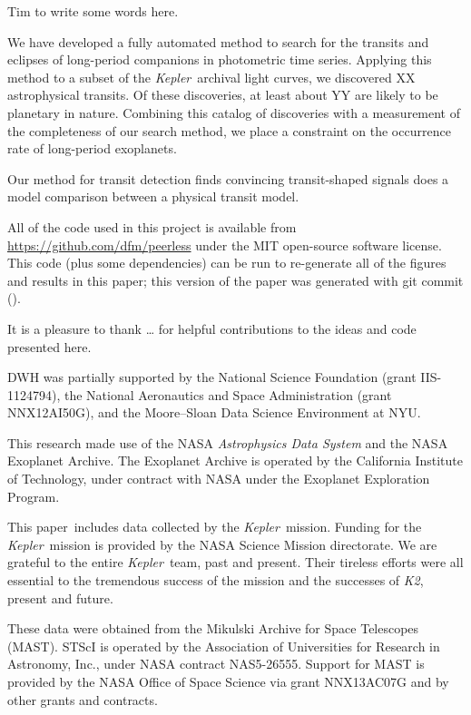 \documentclass[manuscript, letterpaper]{aastex6}
\makeatletter
\let\origsection\section
\renewcommand\section{\@ifstar{\starsection}{\nostarsection}}
\newcommand\nostarsection[1]{\sectionprelude\origsection{#1}}
\newcommand\starsection[1]{\sectionprelude\origsection*{#1}}
\newcommand\sectionprelude{\vspace{1em}}
\newcommand{\project}[1]{\textsl{#1}}
\newcommand{\kepler}{\project{Kepler}}
\newcommand{\KT}{\project{K2}}
\newcommand{\sectlabel}[1]{\label{sect:#1}}
\newcommand{\paper}{paper}
\makeatother
\begin{document}
Tim to write some words here.



\section{Discussion}\sectlabel{discussion}

We have developed a fully automated method to search for the transits and
eclipses of long-period companions in photometric time series.
Applying this method to a subset of the \kepler\ archival light curves, we
discovered XX astrophysical transits.
Of these discoveries, at least about YY are likely to be planetary in nature.
Combining this catalog of discoveries with a measurement of the completeness
of our search method, we place a constraint on the occurrence rate of
long-period exoplanets.

Our method for transit detection finds convincing transit-shaped signals does
a model comparison between a physical transit model.

All of the code used in this project is available from
\url{https://github.com/dfm/peerless} under the MIT open-source software
license.
This code (plus some dependencies) can be run to re-generate all of the
figures and results in this \paper; this version of the paper was generated
with git commit \texttt{\githash} (\gitdate).


\acknowledgments
It is a pleasure to thank
\ldots
for helpful contributions to the ideas and code presented here.

DWH was partially supported by the National Science Foundation (grant
IIS-1124794), the National Aeronautics and Space Administration (grant
NNX12AI50G), and the Moore--Sloan Data Science Environment at NYU.

This research made use of the NASA \project{Astrophysics Data System} and the
NASA Exoplanet Archive.
The Exoplanet Archive is operated by the California Institute of Technology,
under contract with NASA under the Exoplanet Exploration Program.

This \paper\ includes data collected by the \kepler\ mission. Funding for the
\kepler\ mission is provided by the NASA Science Mission directorate.
We are grateful to the entire \kepler\ team, past and present.
Their tireless efforts were all essential to the tremendous success of the
mission and the successes of \KT, present and future.

These data were obtained from the Mikulski Archive for Space Telescopes
(MAST).
STScI is operated by the Association of Universities for Research in
Astronomy, Inc., under NASA contract NAS5-26555.
Support for MAST is provided by the NASA Office of Space Science via grant
NNX13AC07G and by other grants and contracts.
\end{document}
